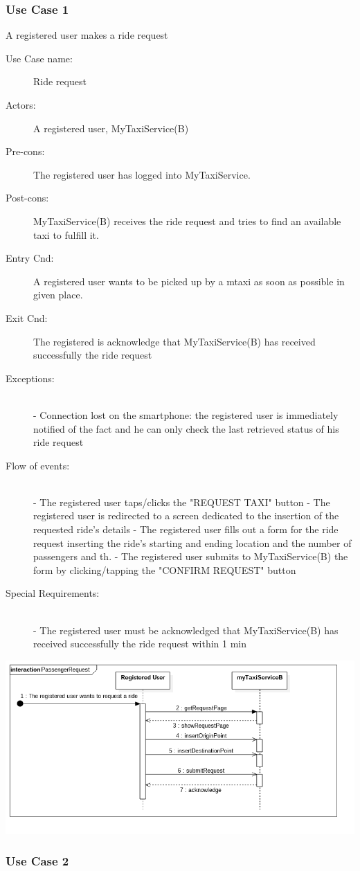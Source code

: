 \documentclass[11pt]{article} %
\begin{document}
\subsubsection{Use Case 1}
	A registered user makes a ride request
	\begin{description}
	\item [Use Case name:]Ride request
	\item [Actors:] A registered user, MyTaxiService(B)
       	\item [Pre-cons:] The registered user has logged into MyTaxiService.
        	\item [Post-cons:] MyTaxiService(B) receives the ride request and tries to find an available taxi to fulfill it.
        	\item [Entry Cnd:] A registered user wants to be picked up by a mtaxi as soon as possible in given place.
        	\item [Exit Cnd:] The registered is acknowledge that MyTaxiService(B) has received successfully the ride
        		request
        	\item[Exceptions:]\hfill \\
          		- Connection lost on the smartphone: the registered user is immediately notified of the fact and
          			he can only check the last retrieved status of his ride request
        	\item [Flow of events:]\hfill \\
          		- The registered user taps/clicks the "REQUEST TAXI" button\newline
          		- The registered user is redirected to a screen dedicated to the insertion
          			of the requested ride's details\newline
          		- The registered user fills out a form for the ride request inserting the ride's starting and ending location
          		and the number of passengers and th.\newline
          		- The registered user submits to MyTaxiService(B) the form by clicking/tapping the "CONFIRM REQUEST" button\newline
           \item[Special Requirements:] \hfill \\
          		- The registered user must be acknowledged that MyTaxiService(B) has received successfully the ride request
          		  within 1 min
	\end{description}
	\includegraphics[scale=0.6]{usecase1SD.png}
\subsubsection{Use Case 2}
\end{document}

